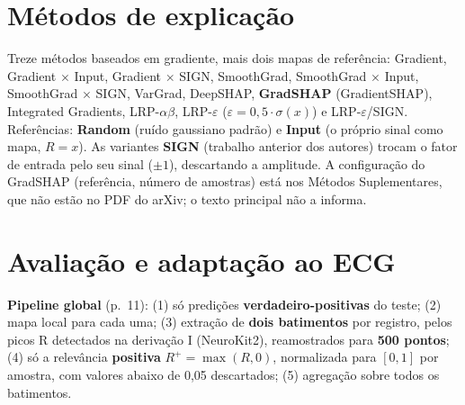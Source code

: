 \documentclass[11pt,a4paper]{article}
\begin{document}
\section{Métodos de explicação}
Treze métodos baseados em gradiente, mais dois mapas de referência: Gradient, Gradient $\times$ Input, Gradient $\times$ SIGN, SmoothGrad, SmoothGrad $\times$ Input, SmoothGrad $\times$ SIGN, VarGrad, DeepSHAP, \textbf{GradSHAP} (GradientSHAP), Integrated Gradients, LRP-$\alpha\beta$, LRP-$\varepsilon$ ($\varepsilon = 0{,}5\cdot\sigma(x)$) e LRP-$\varepsilon$/SIGN. Referências: \textbf{Random} (ruído gaussiano padrão) e \textbf{Input} (o próprio sinal como mapa, $R = x$). As variantes \textbf{SIGN} (trabalho anterior dos autores) trocam o fator de entrada pelo seu sinal ($\pm 1$), descartando a amplitude. A configuração do GradSHAP (referência, número de amostras) está nos Métodos Suplementares, que não estão no PDF do arXiv; o texto principal não a informa.

\section{Avaliação e adaptação ao ECG}
\textbf{Pipeline global} (p.~11): (1) só predições \textbf{verdadeiro-positivas} do teste; (2) mapa local para cada uma; (3) extração de \textbf{dois batimentos} por registro, pelos picos R detectados na derivação I (NeuroKit2), reamostrados para \textbf{500 pontos}; (4) só a relevância \textbf{positiva} $R^+ = \max(R, 0)$, normalizada para $[0,1]$ por amostra, com valores abaixo de 0,05 descartados; (5) agregação sobre todos os batimentos.
\end{document}

